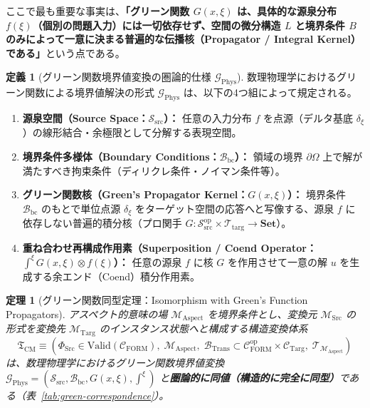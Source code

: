 \documentclass[11pt,a4paper]{ltjsarticle}
\theoremstyle{definition}
\newtheorem{definition}{定義}[section]
\theoremstyle{plain}
\newtheorem{theorem}{定理}[section]
\theoremstyle{remark}
\newcommand{\Valid}{\mathrm{Valid}}
\newcommand{\Set}{\mathbf{Set}}
\newcommand{\CFORM}{\mathcal{C}_{\mathrm{FORM}}}
\newcommand{\CTarg}{\mathcal{C}_{\mathrm{Targ}}}
\newcommand{\MSrc}{\mathcal{M}_{\mathrm{Src}}}
\newcommand{\MTarg}{\mathcal{M}_{\mathrm{Targ}}}
\newcommand{\MAspect}{\mathcal{M}_{\mathrm{Aspect}}}
\newcommand{\BTrans}{\mathcal{B}_{\mathrm{Trans}}}
\begin{document}
ここで最も重要な事実は、\textbf{「グリーン関数 $G(x, \xi)$ は、具体的な源泉分布 $f(\xi)$（個別の問題入力）には一切依存せず、空間の微分構造 $L$ と境界条件 $B$ のみによって一意に決まる普遍的な伝播核（Propagator / Integral Kernel）である」}という点である。

\begin{definition}[グリーン関数境界値変換の圏論的仕様 $\mathcal{G}_{\mathrm{Phys}}$]\label{def:green-spec}
数理物理学におけるグリーン関数による境界値解決の形式 $\mathcal{G}_{\mathrm{Phys}}$ は、以下の4つ組によって規定される。
\begin{enumerate}
    \item \textbf{源泉空間（Source Space：$\mathcal{S}_{\mathrm{src}}$）：} 任意の入力分布 $f$ を点源（デルタ基底 $\delta_\xi$）の線形結合・余極限として分解する表現空間。
    \item \textbf{境界条件多様体（Boundary Conditions：$\mathcal{B}_{\mathrm{bc}}$）：} 領域の境界 $\partial\Omega$ 上で解が満たすべき拘束条件（ディリクレ条件・ノイマン条件等）。
    \item \textbf{グリーン関数核（Green's Propagator Kernel：$G(x, \xi)$）：} 境界条件 $\mathcal{B}_{\mathrm{bc}}$ のもとで単位点源 $\delta_\xi$ をターゲット空間の応答へと写像する、源泉 $f$ に依存しない普遍的積分核（プロ関手 $G : \mathcal{S}_{\mathrm{src}}^{\mathrm{op}} \times \mathcal{T}_{\mathrm{targ}} \to \Set$）。
    \item \textbf{重ね合わせ再構成作用素（Superposition / Coend Operator：$\int^{\xi} G(x, \xi) \otimes f(\xi)$）：} 任意の源泉 $f$ に核 $G$ を作用させて一意の解 $u$ を生成する余エンド（Coend）積分作用素。
\end{enumerate}
\end{definition}

\begin{theorem}[グリーン関数同型定理：Isomorphism with Green's Function Propagators]\label{thm:green-isomorphism}
アスペクト的意味の場 $\MAspect$ を境界条件とし、変換元 $\MSrc$ の形式を変換先 $\MTarg$ のインスタンス状態へと構成する構造変換体系
\begin{equation}
\mathfrak{T}_{\mathrm{CM}} \equiv \left(\Phi_{\mathrm{Src}} \in \Valid(\CFORM),\; \MAspect,\; \BTrans \subset \CFORM^{\mathrm{op}} \times \CTarg,\; \mathcal{T}_{\MAspect}\right)
\end{equation}
は、数理物理学におけるグリーン関数境界値変換 $\mathcal{G}_{\mathrm{Phys}} = (\mathcal{S}_{\mathrm{src}}, \mathcal{B}_{\mathrm{bc}}, G(x, \xi), \int^\xi)$ と\textbf{圏論的に同値（構造的に完全に同型）}である（表~\ref{tab:green-correspondence}）。
\end{theorem}
\end{document}
